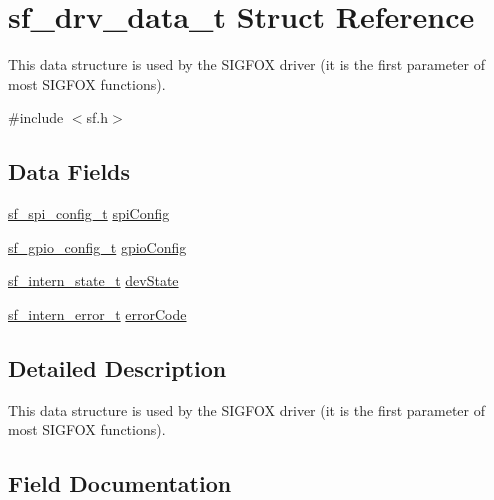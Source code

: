 \hypertarget{structsf__drv__data__t}{}\section{sf\+\_\+drv\+\_\+data\+\_\+t Struct Reference}
\label{structsf__drv__data__t}


This data structure is used by the S\+I\+G\+F\+OX driver (it is the first parameter of most S\+I\+G\+F\+OX functions).  




{\ttfamily \#include $<$sf.\+h$>$}

\subsection*{Data Fields}
\begin{DoxyCompactItemize}
\item 
\mbox{\hyperlink{structsf__spi__config__t}{sf\+\_\+spi\+\_\+config\+\_\+t}} \mbox{\hyperlink{structsf__drv__data__t_a86cf59ba9cfdafebf74e3cb1a5b2a507}{spi\+Config}}
\item 
\mbox{\hyperlink{structsf__gpio__config__t}{sf\+\_\+gpio\+\_\+config\+\_\+t}} \mbox{\hyperlink{structsf__drv__data__t_add32ea9a60dd3cf56bce44e4bb31782d}{gpio\+Config}}
\item 
\mbox{\hyperlink{group__sf__enum__group_gaedd94907ea20da8e6d1cd3e3e3282c2c}{sf\+\_\+intern\+\_\+state\+\_\+t}} \mbox{\hyperlink{structsf__drv__data__t_ac40368e9c874de125257a6078398f161}{dev\+State}}
\item 
\mbox{\hyperlink{group__sf__enum__group_ga9f14f69f90dfff97b98977db7a73ba68}{sf\+\_\+intern\+\_\+error\+\_\+t}} \mbox{\hyperlink{structsf__drv__data__t_ae4b806eb3342162c2058008f9718575d}{error\+Code}}
\end{DoxyCompactItemize}


\subsection{Detailed Description}
This data structure is used by the S\+I\+G\+F\+OX driver (it is the first parameter of most S\+I\+G\+F\+OX functions). 

\subsection{Field Documentation}
\mbox{\label{structsf__drv__data__t_ac40368e9c874de125257a6078398f161}} 
